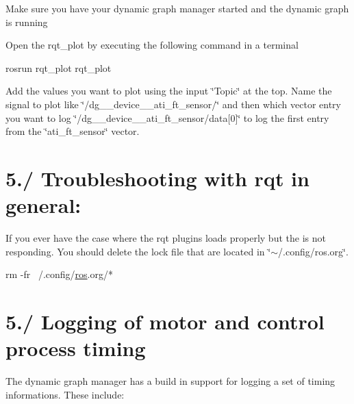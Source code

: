 \begin{DoxyItemize}
\item Make sure you have your dynamic graph manager started and the dynamic graph is running
\item Open the rqt\+\_\+plot by executing the following command in a terminal 
\begin{DoxyCode}
rosrun rqt\_plot rqt\_plot
\end{DoxyCode}

\item Add the values you want to plot using the input \char`\"{}\+Topic\char`\"{} at the top. Name the signal to plot like \char`\"{}/dg\+\_\+\+\_\+device\+\_\+\+\_\+ati\+\_\+ft\+\_\+sensor/\char`\"{} and then which vector entry you want to log \char`\"{}/dg\+\_\+\+\_\+device\+\_\+\+\_\+ati\+\_\+ft\+\_\+sensor/data\mbox{[}0\mbox{]}\char`\"{} to log the first entry from the \char`\"{}ati\+\_\+ft\+\_\+sensor\char`\"{} vector.
\end{DoxyItemize}\hypertarget{subpage_plot_plot_sec_add_rqt_troubleshooting}{}\section{5./ Troubleshooting with rqt in general\+:}\label{subpage_plot_plot_sec_add_rqt_troubleshooting}
If you ever have the case where the rqt plugins loads properly but the is not responding. You should delete the lock file that are located in \char`\"{}$\sim$/.\+config/ros.\+org\char`\"{}. 
\begin{DoxyCode}
rm -fr ~/.config/\hyperlink{namespaceros}{ros}.org\textcolor{comment}{/*}
\end{DoxyCode}
\hypertarget{subpage_plot_plot_sec_add_timing}{}\section{5./ Logging of motor and control process timing}\label{subpage_plot_plot_sec_add_timing}
The dynamic graph manager has a build in support for logging a set of timing informations. These include\+:

